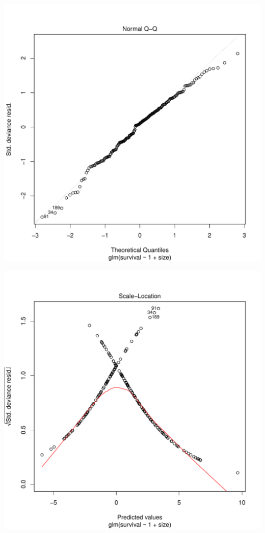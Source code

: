 \documentclass[12pt,a4paper]{scrartcl}\usepackage[]{graphicx}\usepackage[]{color}
\makeatletter
\def\maxwidth{ %
  \ifdim\Gin@nat@width>\linewidth
    \linewidth
  \else
    \Gin@nat@width
  \fi
}
\newenvironment{knitrout}{}{} %
\makeatother
\begin{document}
\begin{Answer}
\begin{knitrout}
\includegraphics[width=\maxwidth]{figure/unnamed-chunk-3-2} 

\includegraphics[width=\maxwidth]{figure/unnamed-chunk-3-3} 


\end{knitrout}
\end{Answer}
\end{document}
